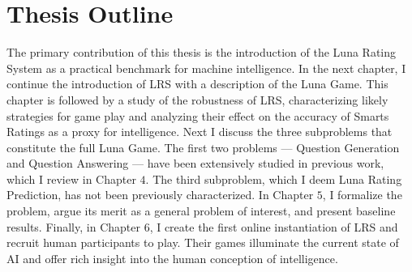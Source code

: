 \section{Thesis Outline}
The primary contribution of this thesis is the introduction of the Luna Rating System as a practical benchmark for machine intelligence. In the next chapter, I continue the introduction of LRS with a description of the Luna Game. This chapter is followed by a study of the robustness of LRS, characterizing likely strategies for game play and analyzing their effect on the accuracy of Smarts Ratings as a proxy for intelligence. Next I discuss the three subproblems that constitute the full Luna Game. The first two problems --- Question Generation and Question Answering --- have been extensively studied in previous work, which I review in Chapter $4$. The third subproblem, which I deem Luna Rating Prediction, has not been previously characterized. In Chapter $5$, I formalize the problem, argue its merit as a general problem of interest, and present baseline results. Finally, in Chapter $6$, I create the first online instantiation of LRS and recruit human participants to play. Their games illuminate the current state of AI and offer rich insight into the human conception of intelligence.
